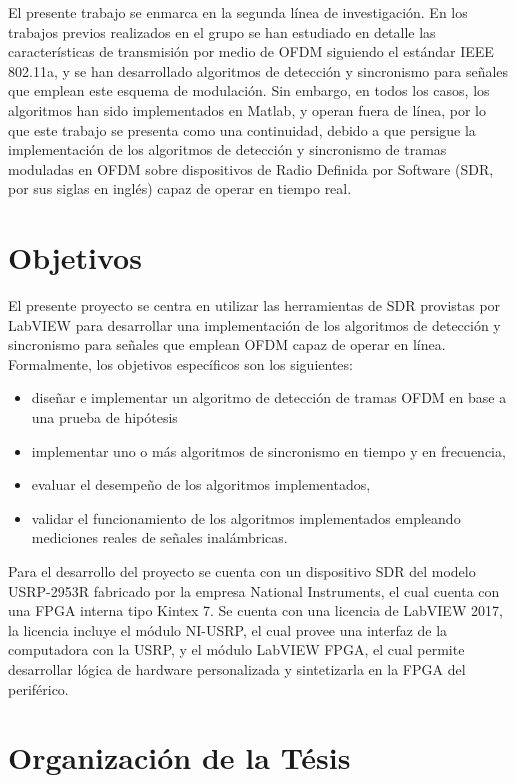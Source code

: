 El presente trabajo se enmarca en la segunda línea de investigación. En los trabajos previos realizados en el grupo se han estudiado en detalle las características de transmisión por medio de OFDM siguiendo el estándar IEEE 802.11a, y se han desarrollado algoritmos de detección y sincronismo para señales que emplean este esquema de modulación. Sin embargo, en todos los casos, los algoritmos han sido implementados en Matlab, y operan fuera de línea, por lo que este trabajo se presenta como una continuidad, debido a que persigue la implementación de los algoritmos de detección y sincronismo de tramas moduladas en OFDM sobre dispositivos de Radio Definida por Software (SDR, por sus siglas en inglés) capaz de operar en tiempo real.

\section{Objetivos}
\label{S:ch1-objetivos}

El presente proyecto se centra en utilizar las herramientas de SDR provistas por LabVIEW para desarrollar una implementación de los algoritmos de detección y sincronismo para señales que emplean OFDM capaz de operar en línea. Formalmente, los objetivos específicos son los siguientes:
\begin{itemize}
    \item diseñar e implementar un algoritmo de detección de tramas OFDM en base a una prueba de hipótesis
    \item implementar uno o más algoritmos de sincronismo en tiempo y en frecuencia,
    \item evaluar el desempeño de los algoritmos implementados, 
    \item validar el funcionamiento de los algoritmos implementados empleando mediciones reales de señales inalámbricas.
\end{itemize}

Para el desarrollo del proyecto se cuenta con un dispositivo SDR del modelo USRP-2953R fabricado por la empresa National Instruments, el cual cuenta con una FPGA interna tipo Kintex 7. Se cuenta con una licencia de LabVIEW 2017, la licencia incluye el módulo NI-USRP, el cual provee una interfaz de la computadora con la USRP, y el módulo LabVIEW FPGA, el cual permite desarrollar lógica de hardware personalizada y sintetizarla en la FPGA del periférico.

\section{Organización de la Tésis}
\label{S:ch1-organización}


